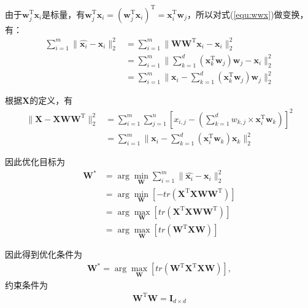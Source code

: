 \documentclass{hitreport}
\begin{document}
由于$\boldsymbol{w}_j^{\text{T}} \boldsymbol{x}_i$是标量，有$\boldsymbol{w}_j^{\text{T}} \boldsymbol{x}_i = \left(\boldsymbol{w}_j^{\text{T}} \boldsymbol{x}_i\right)^{\text{T}} = \boldsymbol{x}_i^{\text{T}}\boldsymbol{w}_j$，所以对式(\ref{equ:wwx})做变换，有：
\begin{align}
\sum_{i=1}^{m}\lVert \hat{\boldsymbol{x}_i} - \boldsymbol{x}_i \rVert_{2}^{2} &= \sum_{i=1}^{m}\lVert \boldsymbol{W}\boldsymbol{W}^{\text{T}}\boldsymbol{x}_i-\boldsymbol{x}_i \rVert_{2}^{2}\\
&=\sum_{i=1}^{m}\lVert \sum_{k=1}^{d}\left(\boldsymbol{x}_k^{\text{T}}\boldsymbol{w}_j\right)\boldsymbol{w}_j - \boldsymbol{x}_i \rVert_{2}^{2}\\
&=\sum_{i=1}^{m}\lVert \boldsymbol{x}_i - \sum_{k=1}^{d}\left(\boldsymbol{x}_k^{\text{T}}\boldsymbol{w}_j\right)\boldsymbol{w}_j \rVert_{2}^{2}
\end{align}

根据$\boldsymbol{X}$的定义，有
\begin{align}
\lVert \boldsymbol{X}-\boldsymbol{X}\boldsymbol{W}\boldsymbol{W}^{\text{T}} \rVert_{\text{2}}^{2} &= \sum_{i=1}^{m}\sum_{j=1}^{n}\left[x_{i,j} - \left(\sum_{k=1}^{d}w_{k,j} \times \boldsymbol{x}_i^{\text{T}}\boldsymbol{w}_k\right)\right]^2\\
& = \sum_{i=1}^{m}\lVert \boldsymbol{x}_i - \sum_{k=1}^{d}\left(\boldsymbol{x}_i^{\text{T}}\boldsymbol{w}_k\right)\boldsymbol{x}_k \rVert_{2}^{2}
\end{align}

因此优化目标为
\begin{align}
\boldsymbol{W}^* &= \arg\underset{\boldsymbol{W}}{\min}\sum_{i=1}^{m}\lVert \hat{\boldsymbol{x}_i}-\boldsymbol{x}_i \rVert_{2}^{2}\\
& = \arg \underset{\boldsymbol{W}}{\min}\left[-tr \left(\boldsymbol{X}^\text{T}\boldsymbol{X}\boldsymbol{W}\boldsymbol{W}^\text{T}\right)\right]\\
& = \arg \underset{\boldsymbol{W}}{\max}\left[tr\left(\boldsymbol{X}^\text{T}\boldsymbol{X}\boldsymbol{W}\boldsymbol{W}^\text{T}\right)\right]\\
& = \arg \underset{\boldsymbol{W}}{\max}\left[tr\left(\boldsymbol{W}^\text{T}\boldsymbol{X}\boldsymbol{W}\right)\right]
\end{align}

因此得到优化条件为
\begin{align}
\boldsymbol{W}^* = \arg \underset{\boldsymbol{W}}{\max}\left[tr\left(\boldsymbol{W}^\text{T}\boldsymbol{X}^\text{T}\boldsymbol{X}\boldsymbol{W}\right)\right],
\end{align}
约束条件为
\begin{align}
\boldsymbol{W}^\text{T}\boldsymbol{W} = \boldsymbol{I}_{d\times d}
\end{align}
\end{document}
